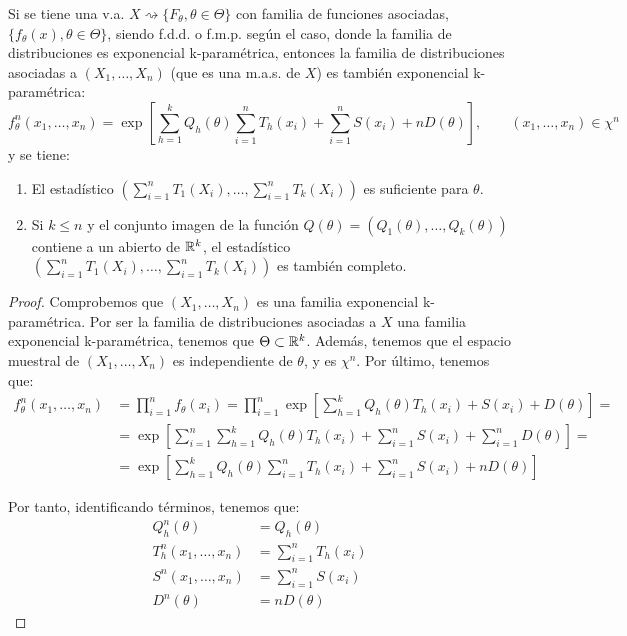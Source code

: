 \begin{teo}
    Si se tiene una v.a. $X \rightsquigarrow \{F_\theta, \theta\in\Theta\}$ con familia de funciones asociadas, $\{f_\theta(x), \theta\in\Theta\}$, siendo f.d.d. o f.m.p. según el caso, donde la familia de distribuciones es exponencial k-paramétrica, entonces la familia de distribuciones asociadas a $(X_1, \ldots, X_n)$ (que es una m.a.s. de $X$) es también exponencial k-paramétrica:
    \begin{equation*}
        f_\theta^n(x_1, \ldots, x_n) = \exp\left[\sum\limits_{h=1}^k Q_h(\theta) \sum\limits_{i=1}^n T_h(x_i) + \sum\limits_{i=1}^n S(x_i) + n D(\theta)\right], \qquad (x_1, \ldots, x_n)\in\chi^n
    \end{equation*}
    y se tiene:
    \begin{enumerate}
        \item El estadístico $(\sum\limits_{i=1}^n T_1(X_i), \ldots, \sum\limits_{i=1}^n T_k(X_i))$ es suficiente para $\theta$.
        \item Si $k\leq n$ y el conjunto imagen de la función $Q(\theta) = (Q_1(\theta), \ldots, Q_k(\theta))$ contiene a un abierto de $\mathbb{R}^k$, el estadístico $(\sum\limits_{i=1}^n T_1(X_i), \ldots, \sum\limits_{i=1}^n T_k(X_i))$ es también completo.
    \end{enumerate}
    \begin{proof}
        Comprobemos que $(X_1, \ldots, X_n)$ es una familia exponencial k-paramétrica. Por ser la familia de distribuciones asociadas a $X$ una familia exponencial k-paramétrica, tenemos que $\Theta \subset \mathbb{R}^k$. Además, tenemos que el espacio muestral de $(X_1, \ldots, X_n)$ es independiente de $\theta$, y es $\chi^n$. Por último, tenemos que:
        \begin{align*}
            f_\theta^n(x_1, \ldots, x_n) &= \prod_{i=1}^n f_\theta(x_i) = \prod_{i=1}^n \exp\left[\sum\limits_{h=1}^k Q_h(\theta) T_h(x_i) + S(x_i) + D(\theta)\right]
            =\\&= \exp\left[\sum\limits_{i=1}^n \sum\limits_{h=1}^k Q_h(\theta) T_h(x_i) + \sum\limits_{i=1}^n S(x_i) + \sum\limits_{i=1}^n D(\theta)\right]
            =\\&= \exp\left[\sum\limits_{h=1}^k Q_h(\theta) \sum\limits_{i=1}^n T_h(x_i) + \sum\limits_{i=1}^n S(x_i) + n D(\theta)\right]
        \end{align*}

        Por tanto, identificando términos, tenemos que:
        \begin{align*}
            Q_h^n(\theta) &= Q_h(\theta) \\
            T_h^n(x_1, \ldots, x_n) &= \sum\limits_{i=1}^n T_h(x_i) \\
            S^n(x_1, \ldots, x_n) &= \sum\limits_{i=1}^n S(x_i) \\
            D^n(\theta) &= n D(\theta)
        \end{align*}


\end{proof}
\end{teo}
